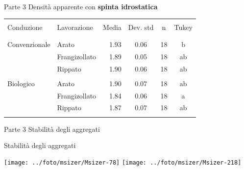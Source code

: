 \documentclass[xcolor={usenames, table, x11names}, final, 10pt]{beamer}
\begin{document}
\begin{frame}{Parte 3 \small{Densità apparente con \bf{\large{spinta idrostatica}}}}

  \footnotesize
  \begin{table}[ht]
    \centering
    \begin{tabular}{llrccc}
      \toprule
      \\
      Conduzione    & Lavorazione   & Media& Dev. std & n    & Tukey \\ 
      \\
      \midrule
      \\
      Convenzionale & Arato         & 1.93 & 0.06      &  18 & b     \\ 
                    & Frangizollato & 1.89 & 0.05      &  18 & ab    \\ 
                    & Rippato       & 1.90 & 0.06      &  18 & ab    \\
      \\
      Biologico     & Arato         & 1.90 & 0.07      &  18 & ab    \\ 
                    & Frangizollato & 1.84 & 0.06      &  18 & a     \\ 
                    & Rippato       & 1.87 & 0.07      &  18 & ab    \\ 
      \\
      \bottomrule
    \end{tabular}
    \label{tab:RiassuntoDensitaSpinta}
  \end{table}
\end{frame}


\begin{frame}{Parte 3 \small{Stabilità degli aggregati}}
\begin{center}
\LARGE Stabilità degli aggregati

\vspace{1.5cm}

    \texttt{[image: ../foto/msizer/Msizer-78]}
    \texttt{[image: ../foto/msizer/Msizer-218]}
\end{center}
\end{frame}
\end{document}
